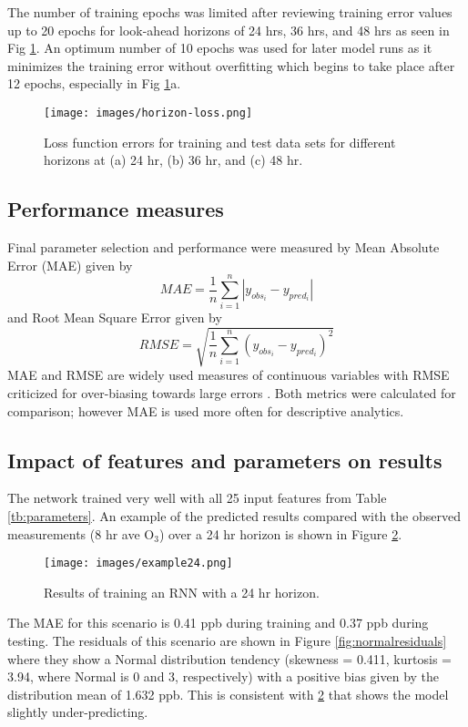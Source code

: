 The number of training epochs was limited after reviewing training error values up to 20 epochs for look-ahead horizons of 24 hrs, 36 hrs, and 48 hrs as seen in Fig \ref{fig:horizon-loss}. An optimum number of 10 epochs was used for later model runs as it minimizes the training error without overfitting which begins to take place after 12 epochs, especially in Fig \ref{fig:horizon-loss}a. 
%
\begin{figure}[H]
\centering
\texttt{[image: images/horizon-loss.png]}
\caption[Loss function errors of training and test data sets]{Loss function errors for training and test data sets for different horizons at (a) 24 hr, (b) 36 hr, and (c) 48 hr.}
\label{fig:horizon-loss}
\end{figure}
%

\subsection{Performance measures}

Final parameter selection and performance were measured by Mean Absolute Error (MAE) given by 
%
\begin{equation}
\label{eq:MAE}
MAE = \frac{1}{n}\sum^{n}_{i=1} \left | y_{obs_{i}}- y_{pred_{i}} \right |
\end{equation}
%
and Root Mean Square Error given by
%
\begin{equation}
\label{eq:RMSE}
RMSE = \sqrt{\frac{1}{n}\sum^{n}_{i=1} \left ( y_{obs_{i}}- y_{pred_{i}} \right )^{2}}
\end{equation}
%
MAE and RMSE are widely used measures of continuous variables with RMSE criticized for over-biasing towards large errors \citep{Chai2014, Willmott2005}. Both metrics were calculated for comparison; however MAE is used more often for descriptive analytics.

\subsection{Impact of features and parameters on results}

The network trained very well with all 25 input features from Table \ref{tb:parameters}. An example of the predicted results compared with the observed measurements (8 hr ave O$_{3}$) over a 24 hr horizon is shown in Figure \ref{fig:example24}.
%
\begin{figure}[H]
\centering
\texttt{[image: images/example24.png]}
\caption{Results of training an RNN with a 24 hr horizon.}
\label{fig:example24}
\end{figure}
%
The MAE for this scenario is 0.41 ppb during training and 0.37 ppb during testing. The residuals of this scenario are shown in Figure \ref{fig:normalresiduals} where they show a Normal distribution tendency (skewness = 0.411, kurtosis = 3.94, where Normal is 0 and 3, respectively) with a positive bias given by the distribution mean of 1.632 ppb. This is consistent with \ref{fig:example24} that shows the model slightly under-predicting.

